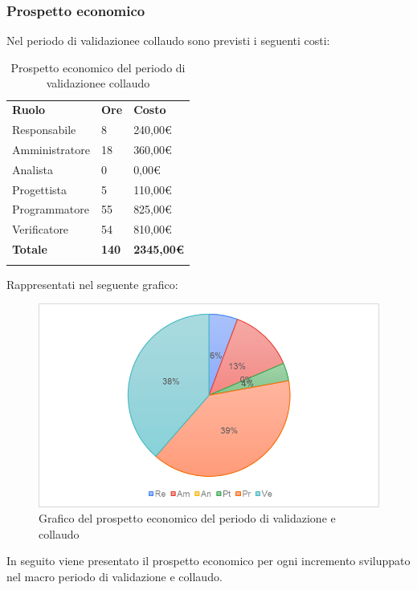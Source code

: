 \subsubsection{Prospetto economico}
Nel periodo di validazione\glosp e collaudo sono previsti i seguenti costi:
\begin{longtable} {
		>{}p{32mm}
		>{}p{20mm}
		>{}p{20mm}
	}
	\rowcolor{gray!50}
	
	\textbf{Ruolo} & \textbf{Ore} & \textbf{Costo} \TBstrut \\
	Responsabile & 8 & 240,00\euro{} \TBstrut \\
	Amministratore & 18 & 360,00\euro{} \TBstrut \\
	Analista & 0 & 0,00\euro{} \TBstrut \\
	Progettista & 5 & 110,00\euro{} \TBstrut \\
	Programmatore & 55 & 825,00\euro{} \TBstrut \\
	Verificatore & 54 & 810,00\euro{} \TBstrut \\
	\textbf{Totale} & \textbf{140}& \textbf{2345,00\euro{}} \TBstrut \\	
	\rowcolor{white}
	\caption{Prospetto economico del periodo di validazione\glosp e collaudo}
\end{longtable}
Rappresentati nel seguente grafico:
\begin{figure} [H]
	\includegraphics[width=\linewidth]{./img/Grafici/8.png}
	\caption{Grafico del prospetto economico del periodo di validazione \glosp e collaudo}
\end{figure}

In seguito viene presentato il prospetto economico per ogni incremento sviluppato nel macro periodo di validazione e collaudo. 
